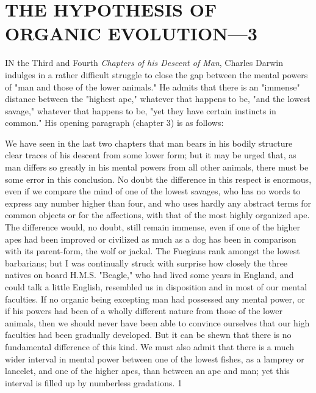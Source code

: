 \chapter{THE HYPOTHESIS OF ORGANIC EVOLUTION—3}

IN the Third and Fourth \textit{Chapters of his Descent of Man}, Charles Darwin indulges in a rather
difficult struggle to close the gap between the mental powers of "man and those of the lower
animals." He admits that there is an "immense" distance between the "highest ape," whatever
that happens to be, "and the lowest savage," whatever that happens to be, "yet they have
certain instincts in common." His opening paragraph (chapter 3) is as follows:

We have seen in the last two chapters that man bears in his bodily structure clear traces of his
descent from some lower form; but it may be urged that, as man differs so greatly in his
mental powers from all other animals, there must be some error in this conclusion. No doubt
the difference in this respect is enormous, even if we compare the mind of one of the lowest
savages, who has no words to express any number higher than four, and who uses hardly any
abstract terms for common objects or for the affections, with that of the most highly
organized ape. The difference would, no doubt, still remain immense, even if one of the
higher apes had been improved or civilized as much as a dog has been in comparison with its
parent-form, the wolf or jackal. The Fuegians rank amongst the lowest barbarians; but I was
continually struck with surprise how closely the three natives on board H.M.S. "Beagle,"
who had lived some years in England, and could talk a little English, resembled us in
disposition and in most of our mental faculties. If no organic being excepting man had
possessed any mental power, or if his powers had been of a wholly different nature from
those of the lower animals, then we should never have been able to convince ourselves that
our high faculties had been gradually developed. But it can be shewn that there is no
fundamental difference of this kind. We must also admit that there is a much wider interval
in mental power between one of the lowest fishes, as a lamprey or lancelet, and one of the
higher apes, than between an ape and man; yet this interval is filled up by numberless
gradations. 1

